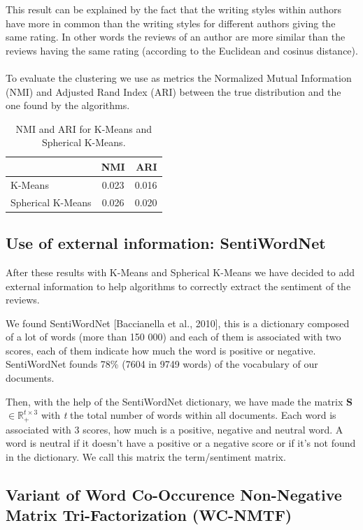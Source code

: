 \documentclass{article}
\begin{document}
This result can be explained by the fact that the writing styles within authors have more in common than the writing styles for different authors giving the same rating. In other words the reviews of an author are more similar than the reviews having the same rating (according to the Euclidean and cosinus distance).
\\\\
To evaluate the clustering we use as metrics the Normalized Mutual Information (NMI) and Adjusted Rand Index (ARI) between the true distribution and the one found by the algorithms.

\begin{table}[H] \label{tab:kmeans_nmi_ari}
\centering
\begin{tabular}{|l|c|r|}
  \hline
  & NMI & ARI \\
  \hline
  K-Means & 0.023 & 0.016 \\
  Spherical K-Means & 0.026 & 0.020 \\
  \hline
\end{tabular}
\caption{NMI and ARI for K-Means and Spherical K-Means.}
\end{table}

\subsection{Use of external information: SentiWordNet}
After these results with K-Means and Spherical K-Means we have decided to add external information to help algorithms to correctly extract the sentiment of the reviews.

We found SentiWordNet [Baccianella et al., 2010], this is a dictionary composed of a lot of words (more than 150 000) and each of them is associated with two scores, each of them indicate how much the word is positive or negative. SentiWordNet founds 78\% (7604 in 9749 words) of the vocabulary of our documents.

Then, with the help of the SentiWordNet dictionary, we have made the matrix \textbf{S} $\in \mathbb{R}^{t \times 3}_{+}$ with \textit{t} the total number of words within all documents. Each word is associated with 3 scores, how much is a positive, negative and neutral word. A word is neutral if it doesn't have a positive or a negative score or if it's not found in the dictionary. We call this matrix the term/sentiment matrix.

\subsection{Variant of Word Co-Occurence Non-Negative Matrix Tri-Factorization (WC-NMTF)}
\end{document}
